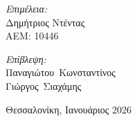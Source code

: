 \documentclass[a4paper,12 pt,oneside]{report}
\begin{document}
\begin{titlepage}
\begin{center}
		\begin{minipage}[t][4cm][t]{0.45\textwidth}
			\raggedright
			\large
			\textit{Επιμέλεια:} \\
			Δημήτριος Ντέντας \\
			ΑΕΜ: 10446
		\end{minipage}%
		\hfill
		\begin{minipage}[t][4cm][t]{0.45\textwidth}
			\raggedleft
			\large
			\textit{Επίβλεψη:} \\
			Παναγιώτου~Κωνσταντίνος \\
			Γιώργος~Σιαχάμης
		\end{minipage}

		\vspace{2cm}

		\begin{center}
			{\large Θεσσαλονίκη, Ιανουάριος 2026}
		\end{center}
	\end{center}
\end{titlepage}



\sloppy

\tableofcontents

\newevenside
{}















\newevenside
\renewcommand{\bibname}{Βιβλιογραφία}

\end{document}
